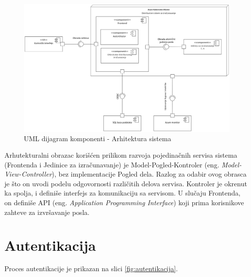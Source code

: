 \documentclass[12pt,oneside]{memoir}
\begin{document}
\begin{figure}[!ht]
  \centering
  \label{fig:arhitektura}
  \includegraphics[width=1.0\textwidth]{./images/arhitektura_sistema_dijagram_komponenti.png}
  \caption{UML dijagram komponenti - Arhitektura sistema}
\end{figure}

Arhutekturalni obrazac korišćen prilikom razvoja pojedinačnih servisa sistema (Frontenda i Jedinice za izračunavanje) je Model-Pogled-Kontroler (eng. \emph{Model-View-Controller}), bez implementacije Pogled dela. Razlog za odabir ovog obrasca je što on uvodi podelu odgovornosti različitih delova servisa. Kontroler je okrenut ka spolja, i definiše interfejs za komunikaciju sa servisom. U slučaju Frontenda, on definiše API (eng. \emph{Application Programming Interface}) koji prima korisnikove zahteve za izvršavanje posla.

\section{Autentikacija}

Proces autentikacije je prikazan na slici \ref{fig:autentikacija}.
\end{document}
